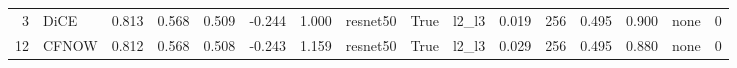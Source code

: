 \begin{tabular}{rlrrrrrlllrlrrlr}
     3 &   DiCE &           0.813 &    0.568 &       0.509 &                         -0.244 &                1.000 &        resnet50 &               True &             l2\_l3 &                          0.019 &                   256 &                      0.495 &                       0.900 &                         none &        0 \\
    12 &  CFNOW &           0.812 &    0.568 &       0.508 &                         -0.243 &                1.159 &        resnet50 &               True &             l2\_l3 &                          0.029 &                   256 &                      0.495 &                       0.880 &                         none &        0 \\
\bottomrule
\end{tabular}
